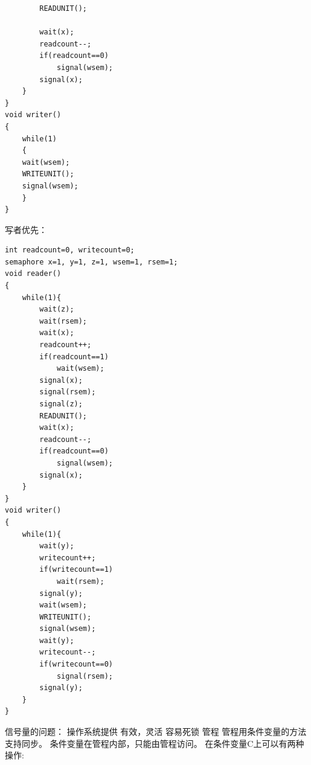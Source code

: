 \documentclass{ctexart}
\begin{document}
\begin{outline}
\begin{verbatim}
        READUNIT();

        wait(x);
        readcount--;
        if(readcount==0)
            signal(wsem);
        signal(x);
    }
}
void writer()
{
    while(1)
    {
    wait(wsem);
    WRITEUNIT();
    signal(wsem);
    }
}
        \end{verbatim}
        \2 写者优先：
        \begin{verbatim}
int readcount=0, writecount=0;
semaphore x=1, y=1, z=1, wsem=1, rsem=1;
void reader()
{
    while(1){
        wait(z);
        wait(rsem);
        wait(x);
        readcount++;
        if(readcount==1)
            wait(wsem);
        signal(x);
        signal(rsem);
        signal(z);
        READUNIT();
        wait(x);
        readcount--;
        if(readcount==0)
            signal(wsem);
        signal(x);
    }
}
void writer()
{
    while(1){
        wait(y);
        writecount++;
        if(writecount==1)
            wait(rsem);
        signal(y);
        wait(wsem);
        WRITEUNIT();
        signal(wsem);
        wait(y);
        writecount--;
        if(writecount==0)
            signal(rsem);
        signal(y);
    }
}
\end{verbatim}
    \1 信号量的问题：
        \2 操作系统提供
        \2 有效，灵活
        \2 容易死锁
    \1 管程
        \2 管程用条件变量的方法支持同步。
        \2 条件变量在管程内部，只能由管程访问。
        \2 在条件变量C上可以有两种操作:
\end{outline}
\end{document}
